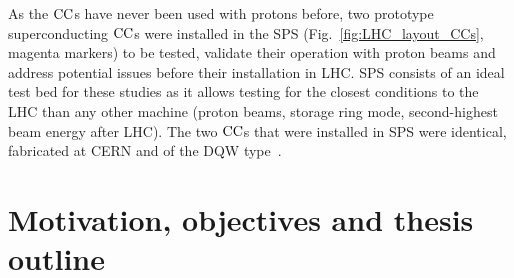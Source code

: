 As the ${\mathrm{CC}}$s have never been used with protons before, two prototype superconducting ${\mathrm{CC}}$s were installed in the SPS (Fig.~\ref{fig:LHC_layout_CCs}, magenta markers) to be tested, validate their operation with proton beams and address potential issues before their installation in LHC. SPS consists of an ideal test bed for these studies as it allows testing for the closest conditions to the LHC than any other machine (proton beams, storage ring mode, second-highest beam energy after LHC). The two ${\mathrm{CC}}$s that were installed in SPS were identical, fabricated at CERN and of the DQW type~\cite{Zanoni:2017}.




\section{Motivation, objectives and thesis outline}

